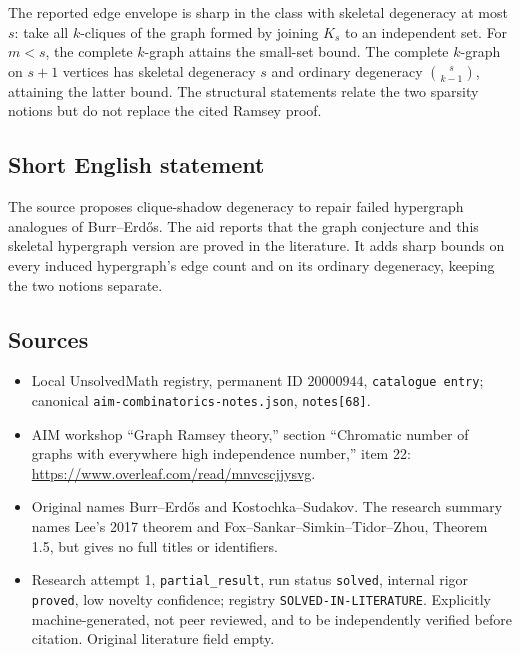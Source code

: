\documentclass[11pt]{article}
\begin{document}
The reported edge envelope is sharp in the class with skeletal degeneracy at most $s$: take all $k$-cliques of the graph formed by joining $K_s$ to an independent set. For $m<s$, the complete $k$-graph attains the small-set bound. The complete $k$-graph on $s+1$ vertices has skeletal degeneracy $s$ and ordinary degeneracy $\binom{s}{k-1}$, attaining the latter bound. The structural statements relate the two sparsity notions but do not replace the cited Ramsey proof.
\subsection{Short English statement}
The source proposes clique-shadow degeneracy to repair failed hypergraph analogues of Burr--Erd\H{o}s. The aid reports that the graph conjecture and this skeletal hypergraph version are proved in the literature. It adds sharp bounds on every induced hypergraph's edge count and on its ordinary degeneracy, keeping the two notions separate.
\subsection{Sources}
\begin{itemize}
\item Local UnsolvedMath registry, permanent ID $20000944$, \texttt{catalogue entry}; canonical \texttt{aim-combinatorics-notes.json}, \texttt{notes[68]}.
\item AIM workshop ``Graph Ramsey theory,'' section ``Chromatic number of graphs with everywhere high independence number,'' item 22: \url{https://www.overleaf.com/read/mnvcscjjysvg}.
\item Original names Burr--Erd\H{o}s and Kostochka--Sudakov. The research summary names Lee's 2017 theorem and Fox--Sankar--Simkin--Tidor--Zhou, Theorem 1.5, but gives no full titles or identifiers.
\item Research attempt 1, \texttt{partial\_result}, run status \texttt{solved}, internal rigor \texttt{proved}, low novelty confidence; registry \texttt{SOLVED-IN-LITERATURE}. Explicitly machine-generated, not peer reviewed, and to be independently verified before citation. Original literature field empty.
\end{itemize}
\end{document}

